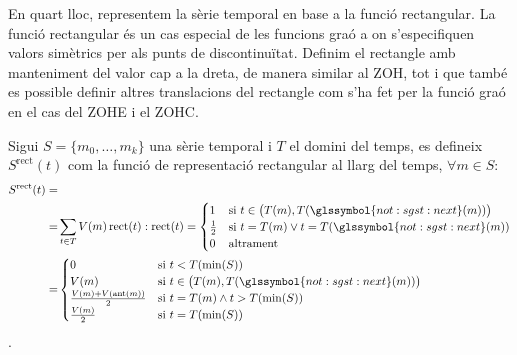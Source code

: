En quart lloc, representem la sèrie temporal en base a la funció
rectangular. La funció rectangular és un cas especial de les funcions
graó a on s'especifiquen valors simètrics per als punts de
discontinuïtat. Definim el rectangle amb manteniment del valor cap a
la dreta, de manera similar al ZOH, tot i que també es possible
definir altres translacions del rectangle com s'ha fet per la funció
graó en el cas del ZOHE i el ZOHC.
\begin{definition}
  Sigui $S=\{m_0,\ldots,m_k\}$ una sèrie temporal i $T$ el domini del
  temps, es defineix $S^\text{rect}(t)$ com la funció de representació
  rectangular al llarg del temps, $\forall m \in S:$
  \begin{align*}
    S^\text{rect}(t) = &  \\
    = & \sum_{t\in T} V(m) \operatorname{rect}(t):  \operatorname{rect}(t) = 
    \begin{cases}
      1 & \text{si } t\in \big(T(m),T(\glssymbol{not:sgst:next}(m))\big) \\
      \frac{1}{2}& \text{si } t = T(m) \vee t=T(\glssymbol{not:sgst:next}(m)) \\
      0 & \text{altrament}
    \end{cases} \\
    = & \begin{cases}
      0 & \text{si }  t<T(\min(S)) \\
      V(m) & \text{si } t\in \big(T(m),T(\glssymbol{not:sgst:next}(m))\big) \\
      \frac{V(m)+V(\ant(m))}{2} & \text{si } t = T(m) \wedge t > T(\min(S)) \\
      \frac{V(m)}{2} & \text{si } t = T(\min(S)) \\
    \end{cases}
         \end{align*}.
\end{definition}





